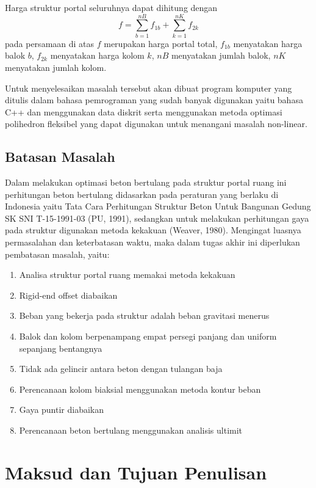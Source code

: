 Harga struktur portal seluruhnya dapat dihitung dengan
\begin{equation}
f = \sum_{b=1}^{nB} f_{1b} + \sum_{k=1}^{nK} f_{2k}
\label{eq:1-12}
\end{equation}
pada persamaan di atas $f$ merupakan harga portal total, $f_{1b}$
menyatakan harga balok $b$, $f_{2k}$ menyatakan harga kolom $k$, $nB$
menyatakan jumlah balok, $nK$ menyatakan jumlah kolom.

Untuk menyelesaikan masalah tersebut akan dibuat program komputer yang
ditulis dalam bahasa pemrograman yang sudah banyak digunakan yaitu bahasa
C++ dan menggunakan data diskrit serta menggunakan metoda optimasi
polihedron fleksibel yang dapat digunakan untuk menangani masalah
non-linear.

\subsection{Batasan Masalah}

Dalam melakukan optimasi beton bertulang pada struktur portal ruang ini
perhitungan beton bertulang didasarkan pada peraturan yang berlaku di
Indonesia yaitu Tata Cara Perhitungan Struktur Beton Untuk Bangunan Gedung
SK SNI T-15-1991-03 (PU, 1991), sedangkan untuk melakukan perhitungan gaya
pada struktur digunakan metoda kekakuan (Weaver, 1980). Mengingat luasnya
permasalahan dan keterbatasan waktu, maka dalam tugas akhir ini diperlukan
pembatasan masalah, yaitu:
\begin{enumerate}[label=\alph*.]
\item Analisa struktur portal ruang memakai metoda kekakuan
\item Rigid-end offset diabaikan
\item Beban yang bekerja pada struktur adalah beban gravitasi menerus
\item Balok dan kolom berpenampang empat persegi panjang dan uniform
      sepanjang bentangnya
\item Tidak ada gelincir antara beton dengan tulangan baja
\item Perencanaan kolom biaksial menggunakan metoda kontur beban
\item Gaya puntir diabaikan
\item Perencanaan beton bertulang menggunakan analisis ultimit
\end{enumerate}

\section{Maksud dan Tujuan Penulisan}

